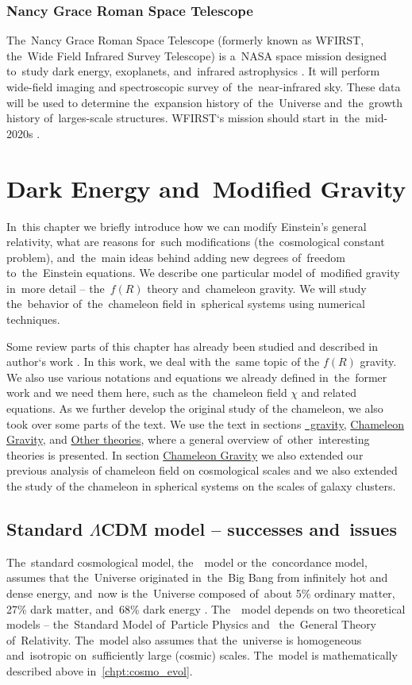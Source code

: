 \subsection{Nancy Grace Roman Space Telescope}
The~Nancy Grace Roman Space Telescope (formerly known as WFIRST, the~Wide Field Infrared Survey Telescope) is a~NASA space mission designed to~study dark energy, exoplanets, and~infrared astrophysics \parencite{wmap_web}. It will perform wide-field imaging and spectroscopic survey of~the~near-infrared sky. These data will be used to determine the~expansion history of~the~Universe and~the~growth history of~larges-scale structures. WFIRST`s mission should start in~the~mid-2020s \parencite{WFIRST_report}.
 \clearpage{}
\clearpage{}\chapter{Dark Energy and~Modified Gravity}
\label{chpt:de_mg}
In~this chapter we briefly introduce how we can modify Einstein's general relativity, what are reasons for~such modifications (the~cosmological constant problem), and~the~main ideas behind adding new degrees of~freedom to~the~Einstein equations. We describe one particular model of~modified gravity in~more detail -- the~$f(R)$ theory and~chameleon gravity. We will study the~behavior of~the~chameleon field in~spherical systems using numerical techniques.

Some review parts of this chapter has already been studied and described in author`s work \textcite{mastersthesis_vrastil}. In this work, we deal with the~same topic of the $f(R)$ gravity. We also use various notations and equations we already defined in~the~former work and we need them here, such as the~chameleon field $\chi$ and related equations. As we further develop the original study of the chameleon, we also took over some parts of the text. We use the text in sections \hyperref[sec:fR]{\fR\ gravity}, \hyperref[sec_cham]{Chameleon Gravity}, and \hyperref[sec:other]{Other theories}, where a general overview of~other~interesting theories is presented. In section \hyperref[sec_cham]{Chameleon Gravity} we also extended our previous analysis of chameleon field on cosmological scales and we also extended the study of the chameleon in spherical systems on the scales of galaxy clusters.

\section{Standard $\Lambda$CDM model -- successes and~issues}
The~standard cosmological model, the~\LCDM\ model or the~concordance model, assumes that the~Universe originated in~the~Big Bang from infinitely hot and dense energy, and~now is the~Universe composed of~about 5\% ordinary matter, 27\% dark matter, and~68\% dark energy \parencite{redefineLCDM}. The~\LCDM\ model depends on two theoretical models -- the~Standard Model of~Particle Physics and~ the~General Theory of~Relativity. The~model also assumes that the~universe is homogeneous and~isotropic on~sufficiently large (cosmic) scales. The~model is mathematically described above in~\autoref{chpt:cosmo_evol}.

